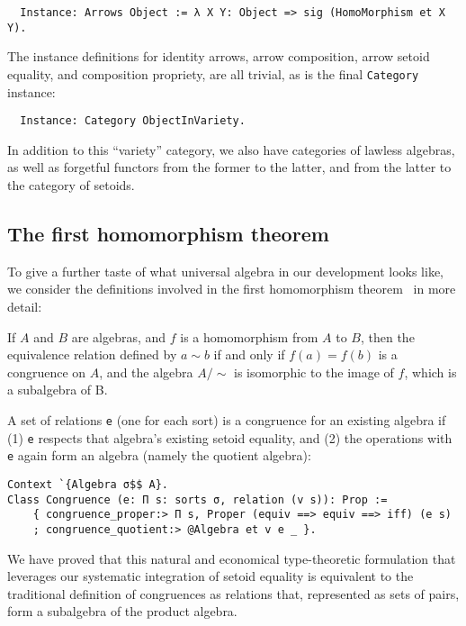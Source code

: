 \documentclass[a4paper,10pt,runningheads]{llncs}
\begin{document}
\begin{lstlisting}
  Instance: Arrows Object := λ X Y: Object => sig (HomoMorphism et X Y).
\end{lstlisting}

The instance definitions for identity arrows, arrow composition, arrow setoid equality, and composition propriety, are all trivial, as is the final \lstinline|Category| instance:
\begin{lstlisting}
  Instance: Category ObjectInVariety.
\end{lstlisting}

In addition to this ``variety'' category, we also have categories of lawless algebras, as well as forgetful functors from the former to the latter, and from the latter to the category of setoids.

\subsection{The first homomorphism theorem}
\label{homothm}

To give a further taste of what universal algebra in our development looks like, we consider the definitions involved in the first homomorphism theorem~\cite{meinke1993universal} in more detail:
\begin{theorem}
If $A$ and $B$ are algebras, and $f$ is a homomorphism from $A$ to $B$, then the equivalence relation defined by $a\sim b$ if and only if $f(a)=f(b)$ is a congruence on $A$, and the algebra $A/\sim$ is isomorphic to the image of $f$, which is a subalgebra of B.
\end{theorem}

A set of relations \lstinline|e| (one for each sort) is a congruence for an existing algebra if (1) \lstinline|e| respects that algebra's existing setoid equality, and (2) the operations with \lstinline|e| again form an algebra (namely the quotient algebra):
\begin{lstlisting}
Context `{Algebra σ$$ A}.
Class Congruence (e: Π s: sorts σ, relation (v s)): Prop :=
    { congruence_proper:> Π s, Proper (equiv ==> equiv ==> iff) (e s)
    ; congruence_quotient:> @Algebra et v e _ }.
\end{lstlisting}
We have proved that this natural and economical type-theoretic formulation that leverages our systematic integration of setoid equality is equivalent to the traditional definition of congruences as relations that, represented as sets of pairs, form a subalgebra of the product algebra.
\end{document}
